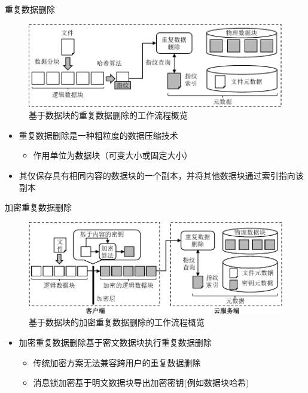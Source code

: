 \documentclass{beamer}
\begin{document}
\begin{frame}{重复数据删除}
    \begin{figure}[!htb]
        \small
        \centering
        \includegraphics[width=\linewidth]{../pic/background/chunk-based-dedup-arch.pdf}
        \caption{基于数据块的重复数据删除的工作流程概览}
        \label{fig:chunk-based-dedup-flow}
    \end{figure}
    \vspace{-1em}
    \begin{itemize}
        \item 重复数据删除是一种粗粒度的数据压缩技术
              \begin{itemize}
                  \item 作用单位为数据块（可变大小或固定大小）
              \end{itemize}
        \item  其仅保存具有相同内容的数据块的一个副本，并将其他数据块通过索引指向该副本
    \end{itemize}
\end{frame}

\begin{frame}{加密重复数据删除}
    \begin{figure}[!htb]
        \small
        \centering
        \includegraphics[width=\textwidth]{../pic/background/chunk-based-enc-dedup-arch.pdf}
        \caption{基于数据块的加密重复数据删除的工作流程概览}
        \label{fig:chunk-based-enc-dedup-flow}
    \end{figure}
    \vspace{-1em}
    \begin{itemize}
        \item 加密重复数据删除基于密文数据块执行重复数据删除
              \begin{itemize}
                  \item 传统加密方案无法兼容跨用户的重复数据删除
                  \item 消息锁加密基于明文数据块导出加密密钥(例如数据块哈希)
              \end{itemize}
    \end{itemize}
\end{frame}
\end{document}
